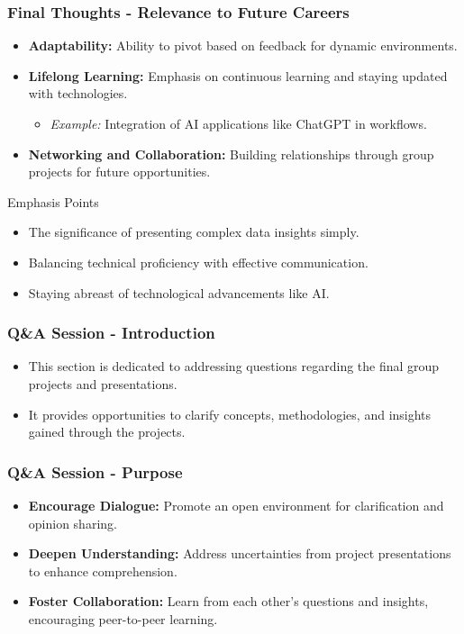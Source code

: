 \documentclass[aspectratio=169]{beamer}
\begin{document}
\begin{frame}[fragile]
    \frametitle{Final Thoughts - Relevance to Future Careers}
    \begin{itemize}
        \item \textbf{Adaptability:} Ability to pivot based on feedback for dynamic environments.
        \item \textbf{Lifelong Learning:} Emphasis on continuous learning and staying updated with technologies.
            \begin{itemize}
                \item \textit{Example:} Integration of AI applications like ChatGPT in workflows.
            \end{itemize}
        \item \textbf{Networking and Collaboration:} Building relationships through group projects for future opportunities.
    \end{itemize}
    
    \begin{block}{Emphasis Points}
        \begin{itemize}
            \item The significance of presenting complex data insights simply.
            \item Balancing technical proficiency with effective communication.
            \item Staying abreast of technological advancements like AI.
        \end{itemize}
    \end{block}
\end{frame}

\begin{frame}[fragile]
    \frametitle{Q\&A Session - Introduction}
    \begin{itemize}
        \item This section is dedicated to addressing questions regarding the final group projects and presentations.
        \item It provides opportunities to clarify concepts, methodologies, and insights gained through the projects.
    \end{itemize}
\end{frame}

\begin{frame}[fragile]
    \frametitle{Q\&A Session - Purpose}
    \begin{itemize}
        \item \textbf{Encourage Dialogue:} Promote an open environment for clarification and opinion sharing.
        \item \textbf{Deepen Understanding:} Address uncertainties from project presentations to enhance comprehension.
        \item \textbf{Foster Collaboration:} Learn from each other's questions and insights, encouraging peer-to-peer learning.
    \end{itemize}
\end{frame}
\end{document}
